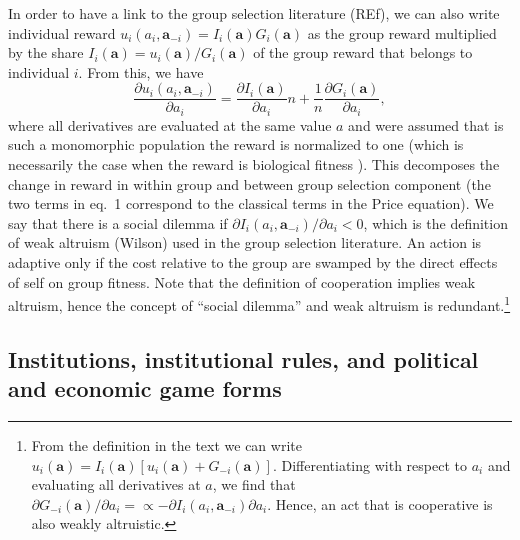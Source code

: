 \documentclass[12pt]{article}
\begin{document}
In order to have a link to the group selection literature (REf), we can also write individual reward $u_i(a_i,\mathbf{a}_{-i})=I_i(\mathbf{a})G_{i}(\mathbf{a})$ as the group reward multiplied by the share
$I_i(\mathbf{a})=u_i(\mathbf{a})/G_{i}(\mathbf{a})$ of the group reward that belongs to individual $i$. From this, we have\begin{equation}
\frac{\partial u_i(a_i,\mathbf{a}_{-i})}{\partial a_i}=\frac{\partial I_i(\mathbf{a})}{\partial a_i}n+\frac{1}{n}\frac{\partial G_i(\mathbf{a})}{\partial a_i},
\end{equation}
where all derivatives are evaluated at the same value $a$ and were assumed that is such a monomorphic population the reward is normalized to one (which is necessarily the case when the reward is biological fitness \citealp{Rousset04}). This decomposes the change in reward in within group and between group selection component (the two terms in eq.~1 correspond to the classical terms in the Price equation). We say that there is a social dilemma if $\partial I_i(a_i,\mathbf{a}_{-i})/\partial a_i<0$, which is the definition of weak altruism (Wilson) used in the group selection literature. An action is adaptive only if the cost relative to the group are swamped by the direct effects of self on group fitness. Note that the definition of cooperation implies weak altruism, hence the concept of ``social dilemma'' and weak altruism is redundant.\footnote{From the definition in the text we can write $u_i(\mathbf{a})=I_i(\mathbf{a})\left[u_i(\mathbf{a})+G_{-i}(\mathbf{a}) \right]$. Differentiating with respect to $a_i$ and evaluating all derivatives at $a$, we find that $\partial G_{-i}(\mathbf{a})/\partial a_i=\propto - \partial I_i(a_i,\mathbf{a}_{-i})\partial a_i$. Hence, an act that is cooperative is also weakly altruistic.}

\newpage


\subsection*{Institutions, institutional rules, and political and economic game forms}
\end{document}
